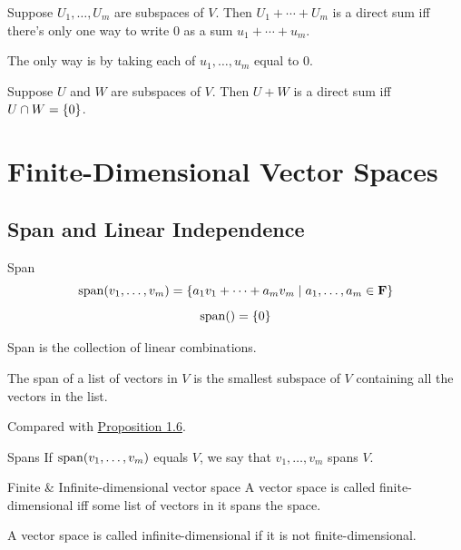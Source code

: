 \documentclass[12pt,a4paper]{article}
\begin{document}
    \begin{prop}
        Suppose $U_1,\dots,U_m$ are subspaces of $V$. Then $U_1+\cdots+U_m$ is a direct sum iff there's only one way to write $0$ as a sum $u_1+\cdots+u_m$.
    \end{prop}
    \begin{remark}
        The only way is by taking each of $u_1,\dots,u_m$ equal to $0$. 
    \end{remark}
    \hfill

    \begin{prop}
        Suppose $U$ and $W$ are subspaces of $V$. Then $U+W$ is a direct sum iff $U\cap W=\left\{0\right\}$.
    \end{prop}
    \hfill

    \section{Finite-Dimensional Vector Spaces}
    \subsection{Span and Linear Independence}
    \begin{defi}{Span}
        $$\operatorname{span}(v_1,\dots,v_m)=\left\{a_1v_1+\cdots+a_mv_m\mid a_1,\dots,a_m\in\mathbf{F}\right\}$$
        $$\operatorname{span}()=\left\{0\right\}$$
    \end{defi}
    \begin{remark}
        Span is the collection of linear combinations.
    \end{remark}
    \hfill
    
    \begin{prop}
        The span of a list of vectors in $V$ is the smallest subspace of $V$ containing all the vectors in the list.
    \end{prop}
    \begin{remark}
        Compared with \hyperref[1.6]{Proposition 1.6}.
    \end{remark}
    \hfill
    
    \begin{defi}{Spans}
        If $\operatorname{span}(v_1,\dots,v_m)$ equals $V$, we say that $v_1,\dots,v_m$ spans $V$.
    \end{defi}
    \hfill

    \begin{defi}{Finite \& Infinite-dimensional vector space}\label{2.4}
        A vector space is called finite-dimensional iff some list of vectors in it spans the space.

        A vector space is called infinite-dimensional if it is not finite-dimensional.
    \end{defi}
    \hfill
\end{document}
